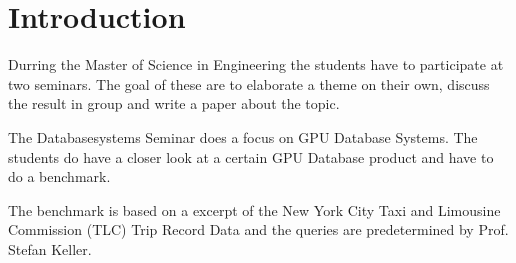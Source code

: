 \chapter{Introduction}
\label{introduction}

Durring the Master of Science in Engineering the students have to participate at two seminars.
The goal of these are to elaborate a theme on their own, discuss the result in group and write a paper about the topic.

The Databasesystems Seminar does a focus on GPU Database Systems.
The students do have a closer look at a certain GPU Database product and have to do a benchmark.

The benchmark is based on a excerpt of the New York City Taxi and Limousine Commission (TLC) Trip Record Data and the queries are predetermined by Prof. Stefan Keller.

